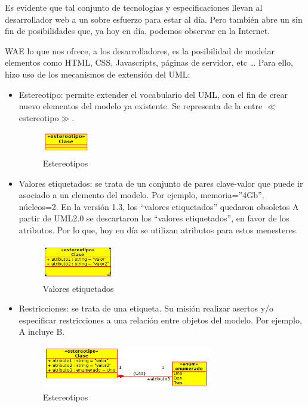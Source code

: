 Es evidente que tal conjunto de tecnologías y especificaciones llevan al desarrollador web a un sobre esfuerzo para estar al día. Pero también abre un sin fin de posibilidades que, ya hoy en día, podemos observar en la Internet.

WAE lo que nos ofrece, a los desarrolladores, es la posibilidad de modelar elementos como HTML, CSS, Javascripts, páginas de servidor, etc … Para ello, hizo uso de los mecanismos de extensión del UML:

\begin{itemize}
\item Estereotipo:  permite extender el vocabulario del UML, con el fin de crear nuevo elementos del modelo ya existente.  Se representa de la entre $\ll$ estereotipo$\gg$.
\begin{figure}[htbp]
\centering
\includegraphics[width=0.2\textwidth]{imagenes/claseestereotipo}
\caption{Estereotipos}
\label{fig:claseestereotipo}
\end{figure}

\item Valores etiquetados: se trata de un conjunto de pares clave-valor que puede ir asociado a un elemento del modelo. Por ejemplo, {memoria=”4Gb”, núcleos=2}. En la versión 1.3, los “valores etiquetados” quedaron obsoletos A partir de UML2.0 se descartaron los “valores etiquetados”, en favor de los atributos. Por lo que, hoy en día se utilizan atributos para estos menesteres.
\begin{figure}[htbp]
\centering
\includegraphics[width=0.3\textwidth]{imagenes/claseetiquetados}
\caption{Valores etiquetados}
\label{fig:claseetiquetados}
\end{figure}

\item Restricciones: se trata de una etiqueta. Su misión realizar asertos y/o especificar restricciones a una relación entre objetos del modelo. Por ejemplo, A {incluye} B.
\begin{figure}[htbp]
\centering
\includegraphics[width=0.7\textwidth]{imagenes/claserestricciones}
\caption{Estereotipos}
\label{fig:claseestereotipos}
\end{figure}

\end{itemize}

